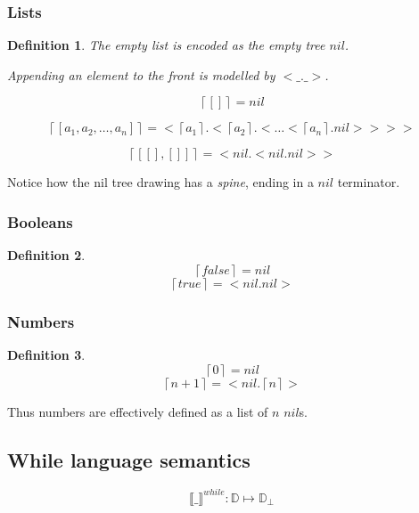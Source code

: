 \documentclass[a4paper, final]{article}
\newcommand{\enc}[1]{\left\lceil#1\right\rceil}
\newtheorem{definition}{Definition}
\begin{document}
\subsubsection{Lists}
\begin{definition}
	The empty list is encoded as the empty tree $nil$.

	Appending an element to the front is modelled by $<\_.\_>$.

	$$\enc{[]}=nil$$

	$$\enc{[a_1,a_2,\ldots,a_n]}=<\enc{a_1}.<\enc{a_2}.<\ldots<\enc{a_n}.nil>>>>$$

	$$\enc{[[],[]]}=<nil.<nil.nil>>$$

\end{definition}

Notice how the nil tree drawing has a \textit{spine}, ending in a $nil$ terminator.

\subsubsection{Booleans}
\begin{definition}
	$$\enc{false}=nil$$
	$$\enc{true} = <nil.nil>$$
\end{definition}

\subsubsection{Numbers}
\begin{definition}
	$$\enc{0} = nil$$
	$$\enc{n+1}=<nil.\enc{n}>$$
\end{definition}

Thus numbers are effectively defined as a list of $n$ $nil$s.

\subsection{While language semantics}
$$\llbracket \_ \rrbracket^{while}:\mathbb{D}\mapsto{\mathbb{D}_\bot}$$
\end{document}
